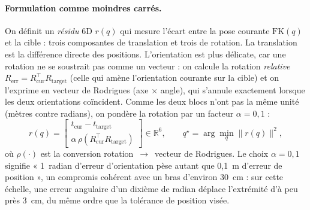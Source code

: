 \paragraph{Formulation comme moindres carrés.} On définit un \emph{résidu} 6D
$r(q)$ qui mesure l'écart entre la pose courante $\mathrm{FK}(q)$ et la cible :
trois composantes de translation et trois de rotation. La translation est la
différence directe des positions. L'orientation est plus délicate, car une
rotation ne se soustrait pas comme un vecteur : on calcule la rotation
\emph{relative} $R_{\text{err}} = R_{\text{cur}}^\top R_{\text{target}}$ (celle
qui amène l'orientation courante sur la cible) et on l'exprime en vecteur de
Rodrigues (axe $\times$ angle), qui s'annule exactement lorsque les deux
orientations coïncident. Comme les deux blocs n'ont pas la même unité (mètres
contre radians), on pondère la rotation par un facteur $\alpha = 0{,}1$ :
\begin{equation}
  r(q) =
  \begin{bmatrix}
    t_{\text{cur}} - t_{\text{target}} \\[2pt]
    \alpha \,\rho\!\left(R_{\text{cur}}^\top R_{\text{target}}\right)
  \end{bmatrix}
  \in \mathbb{R}^6,
  \qquad
  q^\star = \arg\min_q \|r(q)\|^2,
  \label{eq:ik_residual}
\end{equation}
où $\rho(\cdot)$ est la conversion rotation~$\to$~vecteur de Rodrigues. Le choix
$\alpha = 0{,}1$ signifie « 1~radian d'erreur d'orientation pèse autant que
0{,}1~m d'erreur de position », un compromis cohérent avec un bras d'environ
30~cm : sur cette échelle, une erreur angulaire d'un dixième de radian déplace
l'extrémité d'à peu près 3~cm, du même ordre que la tolérance de position visée.

